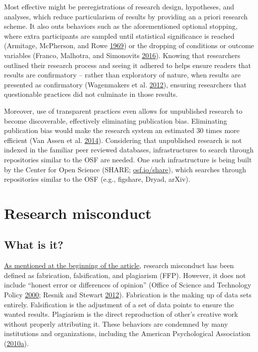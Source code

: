 \documentclass[a5paper]{book}
\begin{document}
Most effective might be preregistrations of research design, hypotheses,
and analyses, which reduce particularism of results by providing an a
priori research scheme. It also outs behaviors such as the
aforementioned optional stopping, where extra participants are sampled
until statistical significance is reached (Armitage, McPherson, and Rowe
\protect\hyperlink{ref-doi:10.2307ux2f2343787}{1969}) or the dropping of
conditions or outcome variables (Franco, Malhotra, and Simonovits
\protect\hyperlink{ref-doi:10.1177ux2f1948550615598377}{2016}). Knowing
that researchers outlined their research process and seeing it adhered
to helps ensure readers that results are confirmatory -- rather than
exploratory of nature, when results are presented as confirmatory
(Wagenmakers et al.
\protect\hyperlink{ref-doi:10.1177ux2f1745691612463078}{2012}), ensuring
researchers that questionable practices did not culminate in those
results.

Moreover, use of transparent practices even allows for unpublished
research to become discoverable, effectively eliminating publication
bias. Eliminating publication bias would make the research system an
estimated 30 times more efficient (Van Assen et al.
\protect\hyperlink{ref-doi:10.1371ux2fjournal.pone.0084896}{2014}).
Considering that unpublished research is not indexed in the familiar
peer reviewed databases, infrastructures to search through repositories
similar to the OSF are needed. One such infrastructure is being built by
the Center for Open Science (SHARE;
\href{https://osf.io/share}{osf.io/share}), which searches through
repositories similar to the OSF (e.g., figshare, Dryad, arXiv).

\hypertarget{research-misconduct}{\section{Research
misconduct}\label{research-misconduct}}

\subsection{What is it?}\label{what-is-it-2}

\protect\hyperlink{introduction}{As mentioned at the beginning of the
article}, research misconduct has been defined as fabrication,
falsification, and plagiarism (FFP). However, it does not include
\enquote{honest error or differences of opinion} (Office of Science and
Technology Policy \protect\hyperlink{ref-ostp2000}{2000}; Resnik and
Stewart
\protect\hyperlink{ref-doi:10.1080ux2f08989621.2012.650948}{2012}).
Fabrication is the making up of data sets entirely. Falsification is the
adjustment of a set of data points to ensure the wanted results.
Plagiarism is the direct reproduction of other's creative work without
properly attributing it. These behaviors are condemned by many
institutions and organizations, including the American Psychological
Association
(\protect\hyperlink{ref-apa2010}{2010}\protect\hyperlink{ref-apa2010}{a}).
\end{document}
